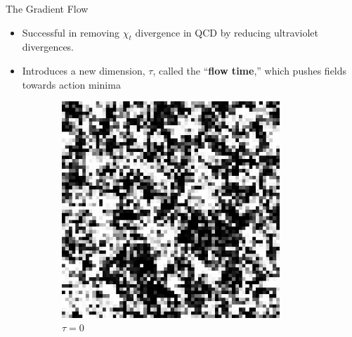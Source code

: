 \documentclass[18pt]{beamer}
\begin{document}
\begin{frame}{}
\begin{columns}[t]
\begin{column}{0.32\linewidth}
        \begin{block}{The Gradient Flow}
        \begin{itemize}
            \item Successful in removing $\chi_t$ divergence in QCD by reducing ultraviolet divergences.
            \item Introduces a new dimension, $\tau$, called the ``{\bf flow time},'' which pushes fields towards action minima 
        \end{itemize}
        \begin{figure}[h]
          \centering
          \def \Width {0.14\textwidth}
              \begin{subfigure}[b]{\Width}\centering
                \includegraphics[width=0.9\textwidth]{gf0.png}
                \caption{$\tau=0$}
              \end{subfigure}%
              \begin{subfigure}[b]{\Width}\centering

\end{subfigure}
\end{figure}
\end{block}
\end{column}
\end{columns}
\end{frame}
\end{document}
